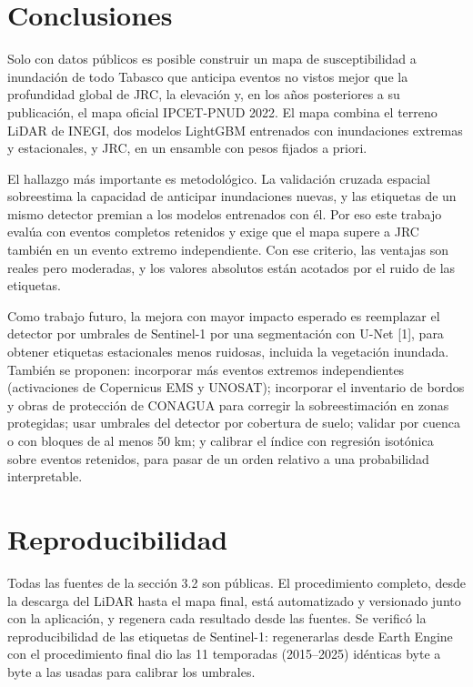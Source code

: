\section{Conclusiones}

Solo con datos públicos es posible construir un mapa de susceptibilidad a inundación de todo Tabasco que anticipa eventos no vistos mejor que la profundidad global de JRC, la elevación y, en los años posteriores a su publicación, el mapa oficial IPCET-PNUD 2022. El mapa combina el terreno LiDAR de INEGI, dos modelos LightGBM entrenados con inundaciones extremas y estacionales, y JRC, en un ensamble con pesos fijados a priori.

El hallazgo más importante es metodológico. La validación cruzada espacial sobreestima la capacidad de anticipar inundaciones nuevas, y las etiquetas de un mismo detector premian a los modelos entrenados con él. Por eso este trabajo evalúa con eventos completos retenidos y exige que el mapa supere a JRC también en un evento extremo independiente. Con ese criterio, las ventajas son reales pero moderadas, y los valores absolutos están acotados por el ruido de las etiquetas.

Como trabajo futuro, la mejora con mayor impacto esperado es reemplazar el detector por umbrales de Sentinel-1 por una segmentación con U-Net {[}1{]}, para obtener etiquetas estacionales menos ruidosas, incluida la vegetación inundada. También se proponen: incorporar más eventos extremos independientes (activaciones de Copernicus EMS y UNOSAT); incorporar el inventario de bordos y obras de protección de CONAGUA para corregir la sobreestimación en zonas protegidas; usar umbrales del detector por cobertura de suelo; validar por cuenca o con bloques de al menos 50 km; y calibrar el índice con regresión isotónica sobre eventos retenidos, para pasar de un orden relativo a una probabilidad interpretable.

\section*{Reproducibilidad}

Todas las fuentes de la sección 3.2 son públicas. El procedimiento completo, desde la descarga del LiDAR hasta el mapa final, está automatizado y versionado junto con la aplicación, y regenera cada resultado desde las fuentes. Se verificó la reproducibilidad de las etiquetas de Sentinel-1: regenerarlas desde Earth Engine con el procedimiento final dio las 11 temporadas (2015--2025) idénticas byte a byte a las usadas para calibrar los umbrales.

